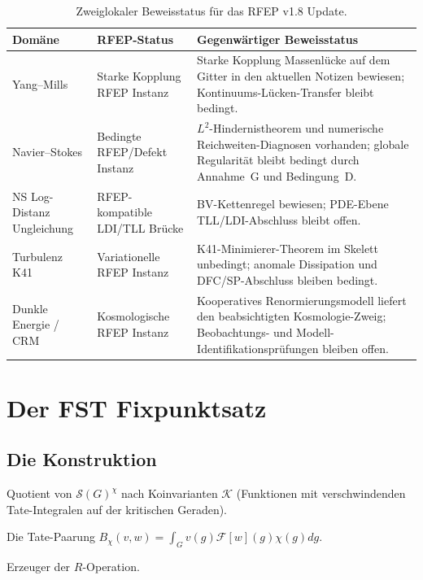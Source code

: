 \documentclass[11pt,a4paper]{article}
\theoremstyle{plain}
\theoremstyle{definition}
\newcommand{\V}{\mathcal{V}}
\renewcommand{\S}{\mathcal{S}}
\newcommand{\K}{\mathcal{K}}
\newcommand{\chifn}{\chi}
\begin{document}
\begin{table}[h]
\centering
\begin{tabular}{p{} p{} p{}}
\toprule
Domäne & RFEP-Status & Gegenwärtiger Beweisstatus \\
\midrule
Yang--Mills & Starke Kopplung RFEP Instanz &
Starke Kopplung Massenlücke auf dem Gitter in den aktuellen Notizen bewiesen; Kontinuums-Lücken-Transfer bleibt bedingt. \\
Navier--Stokes & Bedingte RFEP/Defekt Instanz &
$L^2$-Hindernistheorem und numerische Reichweiten-Diagnosen vorhanden; globale Regularität bleibt bedingt durch Annahme~G und Bedingung~D. \\
NS Log-Distanz Ungleichung & RFEP-kompatible LDI/TLL Brücke &
BV-Kettenregel bewiesen; PDE-Ebene TLL/LDI-Abschluss bleibt offen. \\
Turbulenz K41 & Variationelle RFEP Instanz &
K41-Minimierer-Theorem im Skelett unbedingt; anomale Dissipation und DFC/SP-Abschluss bleiben bedingt. \\
Dunkle Energie / CRM & Kosmologische RFEP Instanz &
Kooperatives Renormierungsmodell liefert den beabsichtigten Kosmologie-Zweig; Beobachtungs- und Modell-Identifikationsprüfungen bleiben offen. \\
\bottomrule
\end{tabular}
\caption{Zweiglokaler Beweisstatus für das RFEP v1.8 Update.}
\label{tab:domain-status}
\end{table}

\section{Der FST Fixpunktsatz}
\label{sec:fixed-point}

\subsection{Die Konstruktion}

\begin{description}[style=nextline]
\item[$\V_\chifn$] Quotient von $\S(G)^\chifn$ nach Koinvarianten $\K$
  (Funktionen mit verschwindenden Tate-Integralen auf der kritischen Geraden).
\item[$B_\chifn$] Die Tate-Paarung $B_\chifn(v, w) = \int_G v(g)
  \mathcal F[w](g) \chifn(g) dg$.
\item[$H_\chifn$] Erzeuger der $R$-Operation.
\end{description}
\end{document}
